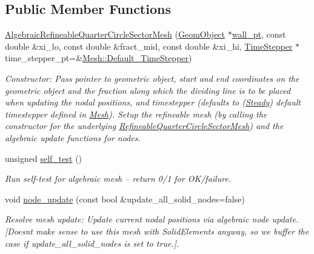 \subsection*{Public Member Functions}
\begin{DoxyCompactItemize}
\item 
\hyperlink{classoomph_1_1AlgebraicRefineableQuarterCircleSectorMesh_a4245d6f0499af21053a0381bc69de271}{Algebraic\+Refineable\+Quarter\+Circle\+Sector\+Mesh} (\hyperlink{classoomph_1_1GeomObject}{Geom\+Object} $\ast$\hyperlink{classoomph_1_1QuarterCircleSectorMesh_a0b03071bbe7e95cc6723c221ddc0998a}{wall\+\_\+pt}, const double \&xi\+\_\+lo, const double \&fract\+\_\+mid, const double \&xi\+\_\+hi, \hyperlink{classoomph_1_1TimeStepper}{Time\+Stepper} $\ast$time\+\_\+stepper\+\_\+pt=\&\hyperlink{classoomph_1_1Mesh_a12243d0fee2b1fcee729ee5a4777ea10}{Mesh\+::\+Default\+\_\+\+Time\+Stepper})
\begin{DoxyCompactList}\small\item\em Constructor\+: Pass pointer to geometric object, start and end coordinates on the geometric object and the fraction along which the dividing line is to be placed when updating the nodal positions, and timestepper (defaults to (\hyperlink{classoomph_1_1Steady}{Steady}) default timestepper defined in \hyperlink{classoomph_1_1Mesh}{Mesh}). Setup the refineable mesh (by calling the constructor for the underlying \hyperlink{classoomph_1_1RefineableQuarterCircleSectorMesh}{Refineable\+Quarter\+Circle\+Sector\+Mesh}) and the algebraic update functions for nodes. \end{DoxyCompactList}\item 
unsigned \hyperlink{classoomph_1_1AlgebraicRefineableQuarterCircleSectorMesh_a68d9738e3d3eedc4d2dd8e1b7fb09d8c}{self\+\_\+test} ()
\begin{DoxyCompactList}\small\item\em Run self-\/test for algebraic mesh -- return 0/1 for O\+K/failure. \end{DoxyCompactList}\item 
void \hyperlink{classoomph_1_1AlgebraicRefineableQuarterCircleSectorMesh_a32a096b894031167a90bafdab167ffc7}{node\+\_\+update} (const bool \&update\+\_\+all\+\_\+solid\+\_\+nodes=false)
\begin{DoxyCompactList}\small\item\em Resolve mesh update\+: Update current nodal positions via algebraic node update. \mbox{[}Doesn\textquotesingle{}t make sense to use this mesh with Solid\+Elements anyway, so we buffer the case if update\+\_\+all\+\_\+solid\+\_\+nodes is set to true.\mbox{]}. \end{DoxyCompactList}\item 

\end{DoxyCompactItemize}
